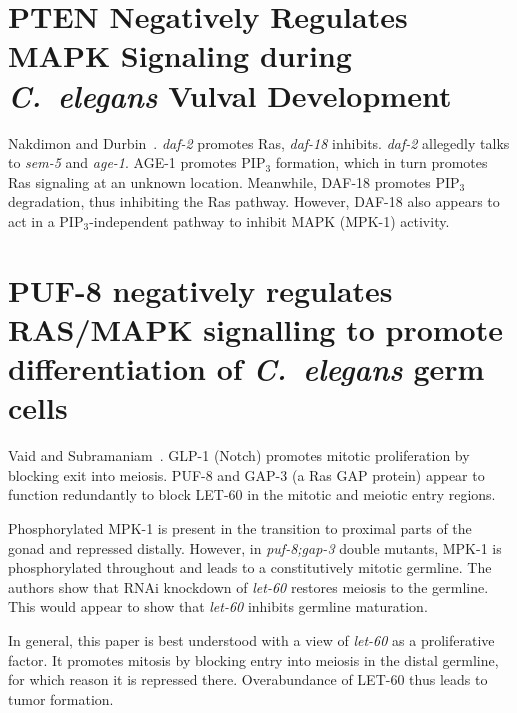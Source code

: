 \documentclass[10pt, onecolumn]{article}
\newcommand{\cel}{\emph{C.~elegans}}
\newcommand{\gene}[1]{\mbox{\emph{#1}}}
\begin{document}
\section*{PTEN Negatively Regulates MAPK Signaling during
          \cel{} Vulval Development}
Nakdimon and Durbin~\cite{Nakdimon2012}. \gene{daf-2} promotes Ras, \gene{daf-18} inhibits.
\gene{daf-2} allegedly talks to \gene{sem-5} and \gene{age-1}. AGE-1 promotes
PIP$_3$ formation, which in turn promotes Ras signaling at an unknown location.
Meanwhile, DAF-18 promotes PIP$_3$ degradation, thus inhibiting the Ras pathway.
However, DAF-18 also appears to act in a PIP$_3$-independent pathway to inhibit
MAPK (MPK-1) activity.

\section*{PUF-8 negatively regulates RAS/MAPK signalling to promote
         differentiation of \cel{} germ cells}
Vaid and Subramaniam~\cite{Vaid2013}. GLP-1 (Notch) promotes mitotic proliferation by
blocking exit into meiosis. PUF-8 and GAP-3 (a Ras GAP protein) appear to function
redundantly to block LET-60 in the mitotic and meiotic entry regions.

Phosphorylated MPK-1 is
present in the transition to proximal parts of the gonad and repressed distally.
However, in \gene{puf-8;gap-3} double mutants, MPK-1 is phosphorylated throughout
and leads to a constitutively mitotic germline.
The authors show that RNAi knockdown of \gene{let-60} restores meiosis to the
germline. This would appear to show that \gene{let-60} inhibits germline
maturation.

In general, this paper is best understood with a view of \gene{let-60} as a
proliferative factor. It promotes mitosis by blocking entry into meiosis in the
distal germline, for which reason it is repressed there. Overabundance of LET-60
thus leads to tumor formation.








\end{document}
